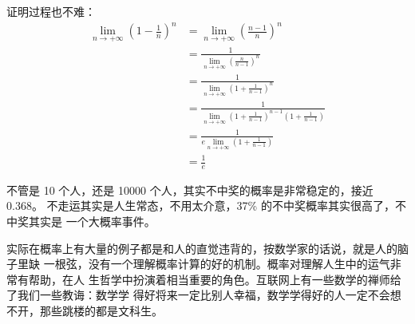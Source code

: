 证明过程也不难：
\begin{align*}
\lim_{n \rightarrow +\infty } (1 - \frac1n)^n & = \lim_{n \rightarrow +\infty } (\frac {n-1} {n})^n   \\
&=  \frac {1} {\displaystyle \lim_{n \rightarrow +\infty } (\frac {n} {n-1})^n} \\
&=  \frac {1} {\displaystyle \lim_{n \rightarrow +\infty } ( 1 + \frac {1}{n-1})^n}  \\
&=  \frac {1} {\displaystyle \lim_{n \rightarrow +\infty } ( 1 + \frac {1}{n-1})^{n-1} (1+\frac {1} {n-1})} \\
&=  \frac {1} {e \displaystyle \lim_{n \rightarrow +\infty } (1+\frac {1} {n-1})} \\
&= \frac1e
\end{align*}

不管是 10 个人，还是 10000 个人，其实不中奖的概率是非常稳定的，接近 0.368。
不走运其实是人生常态，不用太介意，37\% 的不中奖概率其实很高了，不中奖其实是
一个大概率事件。

实际在概率上有大量的例子都是和人的直觉违背的，按数学家的话说，就是人的脑子里缺
一根弦，没有一个理解概率计算的好的机制。概率对理解人生中的运气非常有帮助，在人
生哲学中扮演着相当重要的角色。互联网上有一些数学的禅师给了我们一些教诲：数学学
得好将来一定比别人幸福，数学学得好的人一定不会想不开，那些跳楼的都是文科生。
